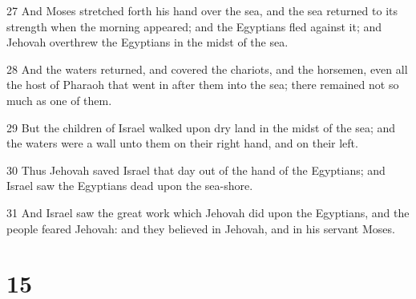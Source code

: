 \par 27 And Moses stretched forth his hand over the sea, and the sea returned to its strength when the morning appeared; and the Egyptians fled against it; and Jehovah overthrew the Egyptians in the midst of the sea.
\par 28 And the waters returned, and covered the chariots, and the horsemen, even all the host of Pharaoh that went in after them into the sea; there remained not so much as one of them.
\par 29 But the children of Israel walked upon dry land in the midst of the sea; and the waters were a wall unto them on their right hand, and on their left.
\par 30 Thus Jehovah saved Israel that day out of the hand of the Egyptians; and Israel saw the Egyptians dead upon the sea-shore.
\par 31 And Israel saw the great work which Jehovah did upon the Egyptians, and the people feared Jehovah: and they believed in Jehovah, and in his servant Moses.

\chapter{15}

